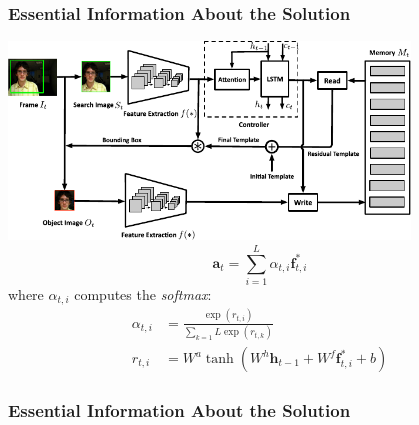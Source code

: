 
\begin{frame}
  \frametitle{Essential Information About the Solution}
  \centering\includegraphics[width=0.8\textwidth]{img/template-Schema.pdf}
  \begin{equation}
      \mathbf{a}_t = \sum_{i=1}^{L}\alpha_{t,i}\mathbf{f}_{t,i}^{*}
  \end{equation}
  where $\alpha_{t,i}$ computes the \emph{softmax}:
  \begin{align}
      \alpha_{t,i} &= \frac{\exp(r_{t,i})}{\sum_{k=1}{L}\exp(r_{t,k})} 
      \\
      r_{t,i} &= W^a \tanh\left( W^h \mathbf{h}_{t-1} + W^f\mathbf{f}_{t,i}^{*} + b \right)
  \end{align}
\end{frame}

\begin{frame}\frametitle{Essential Information About the Solution}
\end{frame}


